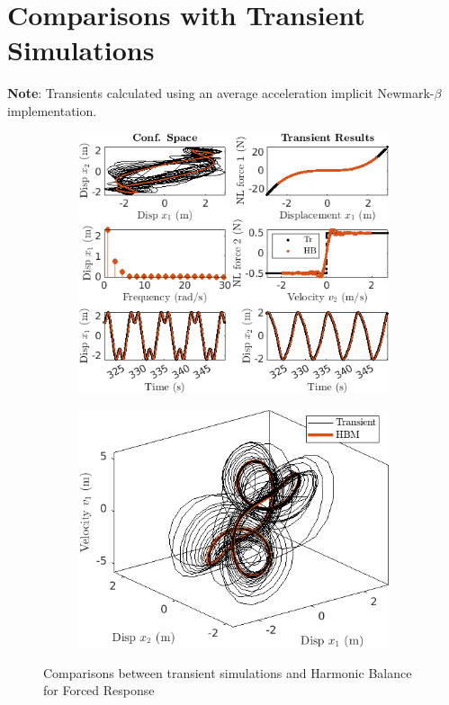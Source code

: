 \documentclass[12pt]{article}
\begin{document}
\pagebreak
\section{Comparisons with Transient Simulations}
\label{sec:comp-with-trans}

\textbf{Note}: Transients calculated using an average acceleration
implicit Newmark-$\beta$ implementation.

\begin{figure}[!h]
  \centering
  \begin{subfigure}{0.5\textwidth}
    \centering
    \includegraphics[width=\linewidth]{FIGS/A_TrComp_33}
    \caption{}
  \end{subfigure}%
  \begin{subfigure}{0.5\textwidth}
    \centering
    \includegraphics[width=\linewidth]{FIGS/A_TrCompSS_33}
    \caption{}
  \end{subfigure}
  \caption{Comparisons between transient simulations and Harmonic
    Balance for Forced Response}
\end{figure}
\end{document}
